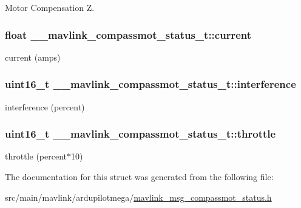 Motor Compensation Z. 

\hypertarget{struct____mavlink__compassmot__status__t_af96c75605fcfa4885b67879ca6d305d1}{
\subsubsection[{current}]{\setlength{\rightskip}{0pt plus 5cm}float \+\_\+\+\_\+mavlink\+\_\+compassmot\+\_\+status\+\_\+t\+::current}}\label{struct____mavlink__compassmot__status__t_af96c75605fcfa4885b67879ca6d305d1}


current (amps) 

\hypertarget{struct____mavlink__compassmot__status__t_a2a1161e6df8225604079692d4bf114b3}{
\subsubsection[{interference}]{\setlength{\rightskip}{0pt plus 5cm}uint16\+\_\+t \+\_\+\+\_\+mavlink\+\_\+compassmot\+\_\+status\+\_\+t\+::interference}}\label{struct____mavlink__compassmot__status__t_a2a1161e6df8225604079692d4bf114b3}


interference (percent) 

\hypertarget{struct____mavlink__compassmot__status__t_a0a15f56f6f13141e00c97835ff8ed944}{
\subsubsection[{throttle}]{\setlength{\rightskip}{0pt plus 5cm}uint16\+\_\+t \+\_\+\+\_\+mavlink\+\_\+compassmot\+\_\+status\+\_\+t\+::throttle}}\label{struct____mavlink__compassmot__status__t_a0a15f56f6f13141e00c97835ff8ed944}


throttle (percent$\ast$10) 



The documentation for this struct was generated from the following file\+:\begin{DoxyCompactItemize}
\item 
src/main/mavlink/ardupilotmega/\hyperlink{mavlink__msg__compassmot__status_8h}{mavlink\+\_\+msg\+\_\+compassmot\+\_\+status.\+h}\end{DoxyCompactItemize}
